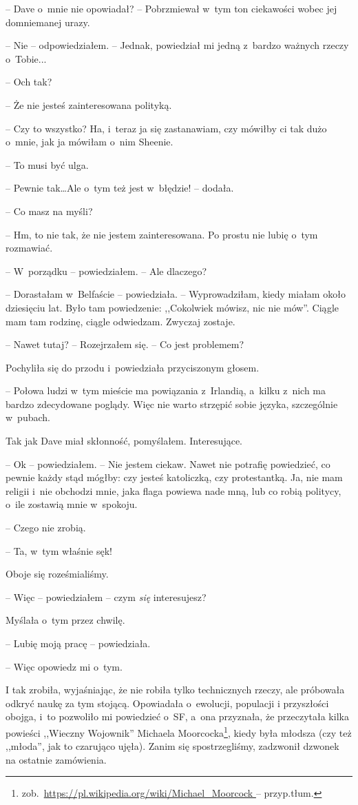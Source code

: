\documentclass[oneside,polish,11pt,sfheadings]{mwbk}
\begin{document}
-- Dave o~mnie nie opowiadał? -- Pobrzmiewał w~tym ton ciekawości wobec
jej domniemanej urazy.

-- Nie -- odpowiedziałem. -- Jednak, powiedział mi jedną z~bardzo ważnych
rzeczy o~Tobie...

-- Och tak?

-- Że nie jesteś zainteresowana polityką.

-- Czy to wszystko? Ha, i~teraz ja się zastanawiam, czy mówiłby ci tak
dużo o~mnie, jak ja mówiłam o~nim Sheenie.

-- To musi być ulga.

-- Pewnie tak\ldots Ale o~tym też jest w~błędzie! -- dodała.

-- Co masz na myśli?

-- Hm, to nie tak, że nie jestem zainteresowana. Po prostu nie lubię o~tym rozmawiać.

-- W~porządku -- powiedziałem. -- Ale dlaczego?

-- Dorastałam w~Belfaście -- powiedziała. -- Wyprowadziłam, kiedy miałam
około dziesięciu lat. Było tam powiedzenie: ,,Cokolwiek mówisz, nic nie
mów''. Ciągle mam tam rodzinę, ciągle odwiedzam. Zwyczaj zostaje.

-- Nawet tutaj? -- Rozejrzałem się. -- Co jest problemem?

Pochyliła się do przodu i~powiedziała przyciszonym głosem. 

-- Połowa
ludzi w~tym mieście ma powiązania z~Irlandią, a~kilku z~nich ma bardzo
zdecydowane poglądy. Więc nie warto strzępić sobie języka, szczególnie w~pubach.

Tak jak Dave miał skłonność, pomyślałem. Interesujące.

-- Ok -- powiedziałem. -- Nie jestem ciekaw. Nawet nie potrafię powiedzieć,
co pewnie każdy stąd mógłby: czy jesteś katoliczką, czy protestantką.
Ja, nie mam religii i~nie obchodzi mnie, jaka flaga powiewa nade mną,
lub co robią politycy, o~ile zostawią mnie w~spokoju.

-- Czego nie zrobią.

-- Ta, w~tym właśnie sęk!

Oboje się roześmialiśmy. 

-- Więc -- powiedziałem -- czym \emph{się
}interesujesz?

Myślała o~tym przez chwilę. 

-- Lubię moją pracę -- powiedziała.

-- Więc opowiedz mi o~tym.

I tak zrobiła, wyjaśniając, że nie robiła tylko technicznych rzeczy, ale
próbowała odkryć naukę za tym stojącą. Opowiadała o~ewolucji, populacji
i przyszłości obojga, i~to pozwoliło mi powiedzieć o~SF, a~ona
przyznała, że przeczytała kilka powieści ,,Wieczny Wojownik'' Michaela
Moorcocka\footnote{
zob.~\url{https://pl.wikipedia.org/wiki/Michael_Moorcock } -- przyp.tłum.}, kiedy była młodsza (czy też ,,młoda'', jak to czarująco
ujęła). Zanim się spostrzegliśmy, zadzwonił dzwonek na ostatnie
zamówienia.
\end{document}

